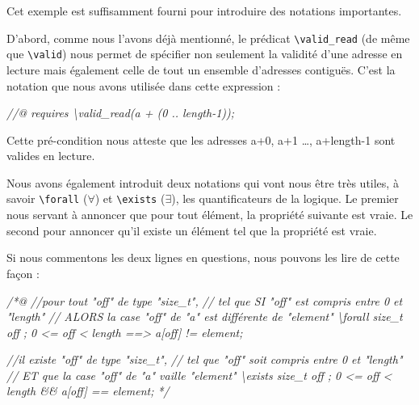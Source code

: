 \documentclass[12pt,francais,]{scrbook}
\newenvironment{Shaded}{}{}
\newcommand{\CommentTok}[1]{\textcolor[rgb]{0.38,0.63,0.69}{\textit{{#1}}}}
\begin{document}
Cet exemple est suffisamment fourni pour introduire des notations
importantes.

D'abord, comme nous l'avons déjà mentionné, le prédicat
\texttt{\textbackslash{}valid\_read} (de même que
\texttt{\textbackslash{}valid}) nous permet de spécifier non seulement
la validité d'une adresse en lecture mais également celle de tout un
ensemble d'adresses contiguës. C'est la notation que nous avons utilisée
dans cette expression :

\begin{footnotesize}\begin{Shaded}
\begin{Highlighting}[]
\CommentTok{//@ requires \textbackslash{}valid_read(a + (0 .. length-1));}
\end{Highlighting}
\end{Shaded}\end{footnotesize}

Cette pré-condition nous atteste que les adresses a+0, a+1 \ldots{},
a+length-1 sont valides en lecture.

Nous avons également introduit deux notations qui vont nous être très
utiles, à savoir \texttt{\textbackslash{}forall} (\(\forall\)) et
\texttt{\textbackslash{}exists} (\(\exists\)), les quantificateurs de la
logique. Le premier nous servant à annoncer que pour tout élément, la
propriété suivante est vraie. Le second pour annoncer qu'il existe un
élément tel que la propriété est vraie.

\clearpage

Si nous commentons les deux lignes en questions, nous pouvons les lire
de cette façon :

\begin{footnotesize}\begin{Shaded}
\begin{Highlighting}[]
\CommentTok{/*@}
\CommentTok{//pour tout "off" de type "size_t", }
\CommentTok{//                tel que SI "off" est compris entre 0 et "length"}
\CommentTok{//                ALORS la case "off" de "a" est différente de "element"}
\CommentTok{\textbackslash{}forall size_t off ; 0 <= off < length ==> a[off] != element;}

\CommentTok{//il existe "off" de type "size_t", }
\CommentTok{//                tel que "off" soit compris entre 0 et "length"}
\CommentTok{//                ET que la case "off" de "a" vaille "element"}
\CommentTok{\textbackslash{}exists size_t off ; 0 <= off < length && a[off] == element;}
\CommentTok{*/}
\end{Highlighting}
\end{Shaded}\end{footnotesize}
\end{document}
